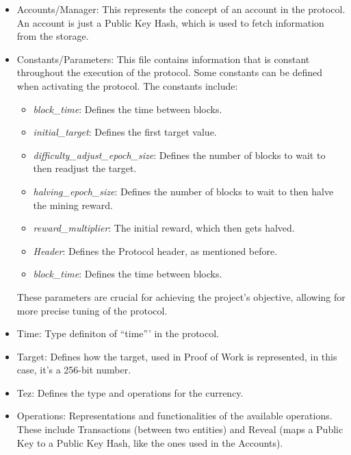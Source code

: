 \begin{itemize}

    \item Accounts/Manager: This represents the concept of an account in the protocol. An account is just a Public Key Hash, which is used to fetch information from the storage. 

    \item Constants/Parameters: This file contains information that is constant throughout the execution of the protocol. Some constants can be defined when activating the protocol. The constants include:

        \begin{itemize}
            \item \emph{block\_time}: Defines the time between blocks.
            \item \emph{initial\_target}: Defines the first target value.
            \item \emph{difficulty\_adjust\_epoch\_size}: Defines the number of blocks to wait to then readjust the target.
            \item \emph{halving\_epoch\_size}: Defines the number of blocks to wait to then halve the mining reward.
            \item \emph{reward\_multiplier}: The initial reward, which then gets halved.
            \item \emph{Header}: Defines the Protocol header, as mentioned before.
            \item \emph{block\_time}: Defines the time between blocks.
        \end{itemize}
        These parameters are crucial for achieving the project's objective, allowing for more precise tuning of the protocol.

    \item Time: Type definiton of ``time''' in the protocol.

    \item Target: Defines how the target, used in Proof of Work is represented, in this case, it's a 256-bit number.

    \item Tez: Defines the type and operations for the currency.

    \item Operations: Representations and functionalities of the available operations. These include Transactions (between two entities) and Reveal (maps a Public Key to a Public Key Hash, like the ones used in the Accounts).

\end{itemize}

